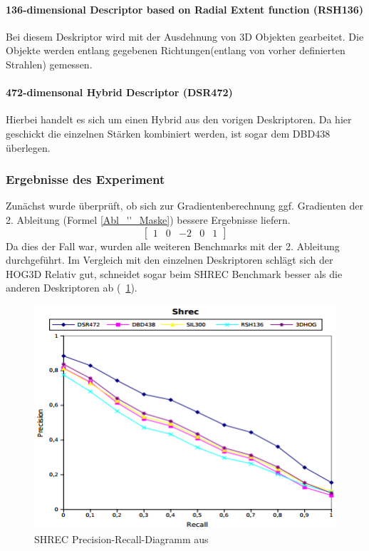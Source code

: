 \paragraph{136-dimensional Descriptor based on Radial Extent function (RSH136) }
Bei diesem Deskriptor wird mit der Ausdehnung von 3D Objekten gearbeitet. Die Objekte werden entlang gegebenen Richtungen(entlang von vorher definierten Strahlen) gemessen.

\paragraph{472-dimensonal Hybrid Descriptor (DSR472) }
Hierbei handelt es sich um einen Hybrid aus den vorigen Deskriptoren. Da hier geschickt die einzelnen Stärken kombiniert werden, ist sogar dem DBD438 überlegen.

\subsubsection{Ergebnisse des Experiment}
Zunächst wurde überprüft, ob sich zur Gradientenberechnung ggf. Gradienten der 2. Ableitung (Formel \ref{Abl_''_Maske}) bessere Ergebnisse liefern.    
\begin{equation}
\label{Abl_''_Maske}
\begin{bmatrix}
1 & 0 & -2 & 0 & 1
\end{bmatrix}
\end{equation}
Da dies der Fall war, wurden alle weiteren Benchmarks mit der 2. Ableitung durchgeführt. Im Vergleich mit den einzelnen Deskriptoren schlägt sich der HOG3D Relativ gut, schneidet sogar beim SHREC Benchmark besser als die anderen Deskriptoren ab (\figurename~\ref{Shrec_diag}).

 \begin{figure}[thpb]
 	\centering
 	\includegraphics[width=\linewidth]{2-Hauptteil/pics/SHREC_diag.png}
 	\caption{SHREC Precision-Recall-Diagramm aus \cite{scherer2010histograms}}
 	\label{Shrec_diag}
 \end{figure}
 
